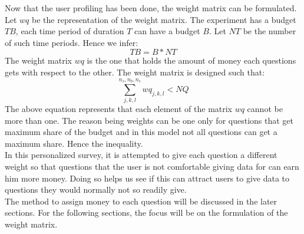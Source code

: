 Now that the user profiling has been done, the weight matrix can be formulated. Let $wq$ be the representation of the weight matrix. The experiment has a budget $TB$, each time period of duration $T$ can
have a budget $B$. Let $NT$ be the number of such time periods. Hence we infer:
$$TB = B*NT$$
The weight matrix $wq$ is the one that holds the amount of money each questions gets with respect to the other. The weight matrix is
designed such that:
$$\sum^{n_s,n_b,n_c}_{j,k,l} wq_{j,k,l} < NQ$$ 
The above equation represents that each element of the matrix $wq$ cannot be more than one. The reason being
weights can be one only for questions that get maximum share of the budget and in this model
not all questions can get a maximum share. Hence the inequality.\\
In this personalized survey, it is attempted to give each question a different
weight so that questions that the user is not comfortable giving data for can earn him more money. Doing so helps us see if this can attract users to give data to questions they would normally not so readily give.\\
The method to assign money to each question will be discussed in the later sections. For the following sections, the focus
will be on the formulation of the weight matrix. 

